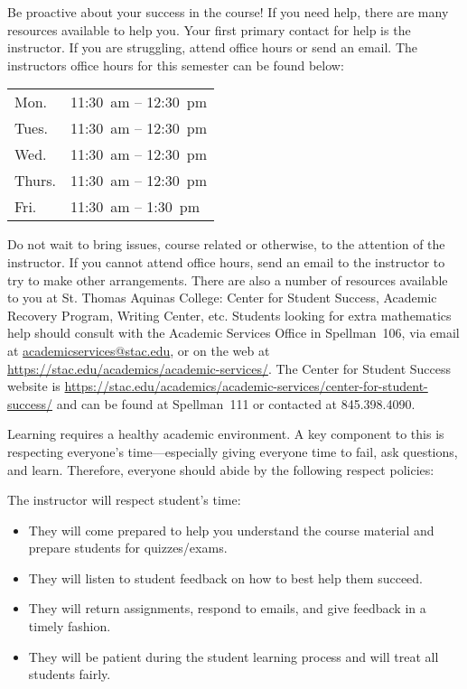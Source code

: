 \documentclass[11pt,letterpaper]{article}
\begin{document}
Be proactive about your success in the course! If you need help, there are many resources available to help you. Your first primary contact for help is the instructor. If you are struggling, attend office hours or send an email. The instructors office hours for this semester can be found below: \par
	\begin{table}[!ht]
	\centering
	\begin{tabular}{l || l}
	Mon. & 11:30~am -- 12:30~pm \\
	Tues. & 11:30~am -- 12:30~pm \\
	Wed. & 11:30~am -- 12:30~pm \\
	Thurs. & 11:30~am -- 12:30~pm \\
	Fri. & 11:30~am -- 1:30~pm
	\end{tabular}
	\end{table}
Do not wait to bring issues, course related or otherwise, to the attention of the instructor. If you cannot attend office hours, send an email to the instructor to try to make other arrangements. There are also a number of resources available to you at St. Thomas Aquinas College: Center for Student Success, Academic Recovery Program, Writing Center, etc. Students looking for extra mathematics help should consult with the Academic Services Office in Spellman~106, via email at \href{mailto:AcademicServices@stac.edu}{academicservices@stac.edu}, or on the web at \href{https://stac.edu/academics/academic-services/}{https://stac.edu/academics/academic-services/}. The Center for Student Success website is \url{https://stac.edu/academics/academic-services/center-for-student-success/} and can be found at Spellman~111 or contacted at 845.398.4090. \pspace



Learning requires a healthy academic environment. A key component to this is respecting everyone's time---especially giving everyone time to fail, ask questions, and learn. Therefore, everyone should abide by the following respect policies: \pspace

The instructor will respect student's time:
	\begin{itemize}
	\item They will come prepared to help you understand the course material and prepare students for quizzes/exams. 
	\item They will listen to student feedback on how to best help them succeed. 
	\item They will return assignments, respond to emails, and give feedback in a timely fashion. 
	\item They will be patient during the student learning process and will treat all students fairly. 
	\end{itemize} \pspace
\end{document}
